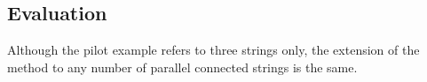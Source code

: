 \documentclass[conference]{IEEEtran}
\begin{document}

\subsection{Evaluation}
Although the pilot example refers to three strings only, the extension of the method to any number of parallel connected strings is the same.
\end{document}
